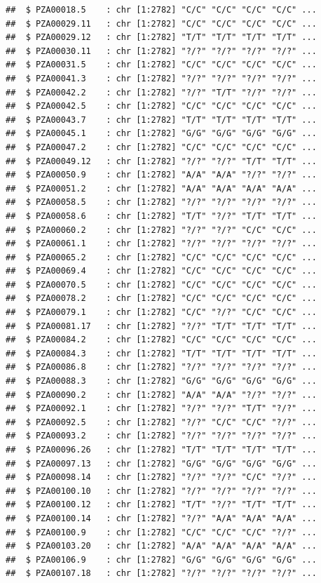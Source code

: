 \documentclass[
]{article}
\begin{document}
\begin{verbatim}
##  $ PZA00018.5    : chr [1:2782] "C/C" "C/C" "C/C" "C/C" ...
##  $ PZA00029.11   : chr [1:2782] "C/C" "C/C" "C/C" "C/C" ...
##  $ PZA00029.12   : chr [1:2782] "T/T" "T/T" "T/T" "T/T" ...
##  $ PZA00030.11   : chr [1:2782] "?/?" "?/?" "?/?" "?/?" ...
##  $ PZA00031.5    : chr [1:2782] "C/C" "C/C" "C/C" "C/C" ...
##  $ PZA00041.3    : chr [1:2782] "?/?" "?/?" "?/?" "?/?" ...
##  $ PZA00042.2    : chr [1:2782] "?/?" "T/T" "?/?" "?/?" ...
##  $ PZA00042.5    : chr [1:2782] "C/C" "C/C" "C/C" "C/C" ...
##  $ PZA00043.7    : chr [1:2782] "T/T" "T/T" "T/T" "T/T" ...
##  $ PZA00045.1    : chr [1:2782] "G/G" "G/G" "G/G" "G/G" ...
##  $ PZA00047.2    : chr [1:2782] "C/C" "C/C" "C/C" "C/C" ...
##  $ PZA00049.12   : chr [1:2782] "?/?" "?/?" "T/T" "T/T" ...
##  $ PZA00050.9    : chr [1:2782] "A/A" "A/A" "?/?" "?/?" ...
##  $ PZA00051.2    : chr [1:2782] "A/A" "A/A" "A/A" "A/A" ...
##  $ PZA00058.5    : chr [1:2782] "?/?" "?/?" "?/?" "?/?" ...
##  $ PZA00058.6    : chr [1:2782] "T/T" "?/?" "T/T" "T/T" ...
##  $ PZA00060.2    : chr [1:2782] "?/?" "?/?" "C/C" "C/C" ...
##  $ PZA00061.1    : chr [1:2782] "?/?" "?/?" "?/?" "?/?" ...
##  $ PZA00065.2    : chr [1:2782] "C/C" "C/C" "C/C" "C/C" ...
##  $ PZA00069.4    : chr [1:2782] "C/C" "C/C" "C/C" "C/C" ...
##  $ PZA00070.5    : chr [1:2782] "C/C" "C/C" "C/C" "C/C" ...
##  $ PZA00078.2    : chr [1:2782] "C/C" "C/C" "C/C" "C/C" ...
##  $ PZA00079.1    : chr [1:2782] "C/C" "?/?" "C/C" "C/C" ...
##  $ PZA00081.17   : chr [1:2782] "?/?" "T/T" "T/T" "T/T" ...
##  $ PZA00084.2    : chr [1:2782] "C/C" "C/C" "C/C" "C/C" ...
##  $ PZA00084.3    : chr [1:2782] "T/T" "T/T" "T/T" "T/T" ...
##  $ PZA00086.8    : chr [1:2782] "?/?" "?/?" "?/?" "?/?" ...
##  $ PZA00088.3    : chr [1:2782] "G/G" "G/G" "G/G" "G/G" ...
##  $ PZA00090.2    : chr [1:2782] "A/A" "A/A" "?/?" "?/?" ...
##  $ PZA00092.1    : chr [1:2782] "?/?" "?/?" "T/T" "?/?" ...
##  $ PZA00092.5    : chr [1:2782] "?/?" "C/C" "C/C" "?/?" ...
##  $ PZA00093.2    : chr [1:2782] "?/?" "?/?" "?/?" "?/?" ...
##  $ PZA00096.26   : chr [1:2782] "T/T" "T/T" "T/T" "T/T" ...
##  $ PZA00097.13   : chr [1:2782] "G/G" "G/G" "G/G" "G/G" ...
##  $ PZA00098.14   : chr [1:2782] "?/?" "?/?" "C/C" "?/?" ...
##  $ PZA00100.10   : chr [1:2782] "?/?" "?/?" "?/?" "?/?" ...
##  $ PZA00100.12   : chr [1:2782] "T/T" "?/?" "T/T" "T/T" ...
##  $ PZA00100.14   : chr [1:2782] "?/?" "A/A" "A/A" "A/A" ...
##  $ PZA00100.9    : chr [1:2782] "C/C" "C/C" "C/C" "?/?" ...
##  $ PZA00103.20   : chr [1:2782] "A/A" "A/A" "A/A" "A/A" ...
##  $ PZA00106.9    : chr [1:2782] "G/G" "G/G" "G/G" "G/G" ...
##  $ PZA00107.18   : chr [1:2782] "?/?" "?/?" "?/?" "?/?" ...

\end{verbatim}
\end{document}
